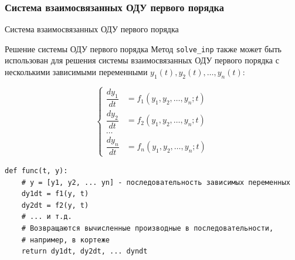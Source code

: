 \documentclass[aspectratio=169, mathserif]{beamer}	%
\begin{document}
\subsubsection{Система взаимосвязанных ОДУ первого порядка}
\begin{frame}[fragile]{Система взаимосвязанных ОДУ первого порядка}
\scriptsize
\begin{alertblock}{\footnotesize{Решение системы ОДУ первого порядка}}
	Метод \texttt{solve\_inp} также может быть использован для решения системы взаимосвязанных ОДУ первого порядка с несколькими зависимыми переменными $y_1(t), y_2(t),\dots, y_n(t)$: 
\end{alertblock}

\begin{equation*}
	\left\{
	\begin{aligned}
		\dfrac{dy_1}{dt} &= f_1\left(y_1, y_2,\dots, y_n; t\right)\\
		\dfrac{dy_2}{dt} &= f_2\left(y_1, y_2,\dots, y_n; t\right)\\
		\dots \\
		\dfrac{dy_n}{dt} &= f_n\left(y_1, y_2,\dots, y_n; t\right)
	\end{aligned}
	\right.
\end{equation*}

\begin{lstlisting}[language=iPython, numbers=none, ]
def func(t, y):
    # y = [y1, y2, ... yn] - последовательность зависимых переменных
    dy1dt = f1(y, t) 
    dy2dt = f2(y, t)
    # ... и т.д.
    # Возвращаются вычисленные производные в последовательности,
    # например, в кортеже
    return dy1dt, dy2dt, ... dyndt
\end{lstlisting}
\vfil
\end{frame}
\end{document}
